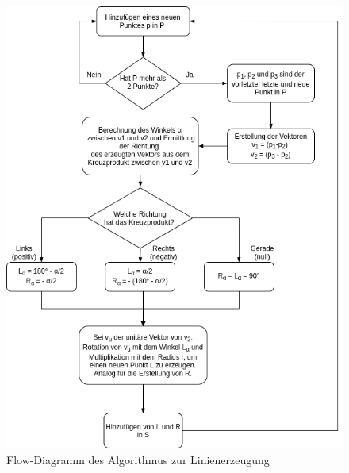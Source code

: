 \documentclass[doktyp=studarbeit]{TUBAFarbeiten}
\begin{document}
\begin{figure}[!htb]
    \centering
    \includegraphics[width=0.8\linewidth]{line.png}
    \caption{Flow-Diagramm des Algorithmus zur Linienerzeugung}
    \label{fig:line-alg}
\end{figure}
\end{document}
